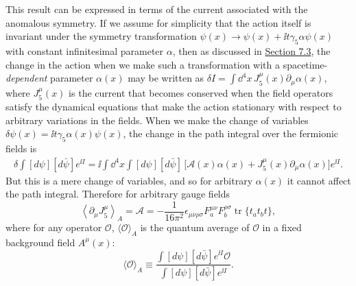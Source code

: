 This result can be expressed in terms of the current associated with the
anomalous symmetry. If we assume for simplicity that the action itself is
invariant under the symmetry transformation
$\psi(x)\to\psi(x)+\ii t\gamma_5\alpha\psi(x)$ with constant infinitesimal
parameter $\alpha$, then as discussed in
\hyperref[sec:7.3]{Section 7.3}, the change in the action when we make such
a transformation with a spacetime-\emph{dependent} parameter $\alpha(x)$
may be written as
$\delta I=\int \dd^4x\,J_5^\mu(x)\partial_\mu\alpha(x)$, where $J_5^\mu(x)$
is the current that becomes conserved when the field operators satisfy the
dynamical equations that make the action stationary with respect to
arbitrary variations in the fields. When we make the change of variables
$\delta\psi(x)=\ii t\gamma_5\alpha(x)\psi(x)$, the change in the path integral
over the fermionic fields is
\begin{equation}
 \begin{aligned}
 \delta\int[d\psi][d\bar\psi]e^{\ii I}
 =\ii\int \dd^4x\int[d\psi][d\bar\psi]\,
 \bigl[\mathcal A(x)\alpha(x)
 +J_5^\mu(x)\partial_\mu\alpha(x)\bigr]e^{\ii I}.
 \end{aligned}
 \tag{22.2.25}\label{eq:22.2.25}
\end{equation}
But this is a mere change of variables, and so for arbitrary $\alpha(x)$
it cannot affect the path integral. Therefore for arbitrary gauge fields
\begin{equation}
 \left\langle\partial_\mu J_5^\mu\right\rangle_A
 =\mathcal A
 =-\frac{1}{16\pi^2}\epsilon_{\mu\nu\rho\sigma}
 F_a^{\mu\nu}F_b^{\rho\sigma}
 \operatorname{tr}\{t_a t_b t\},
 \tag{22.2.26}\label{eq:22.2.26}
\end{equation}
where for any operator $\mathcal O$, $\langle\mathcal O\rangle_A$ is the
quantum average of $\mathcal O$ in a fixed background field $A^\mu(x)$:
\begin{equation}
 \langle\mathcal O\rangle_A\equiv
 \frac{\int[d\psi][d\bar\psi]e^{\ii I}\mathcal O}
 {\int[d\psi][d\bar\psi]e^{\ii I}}.
 \tag{22.2.27}\label{eq:22.2.27}
\end{equation}

